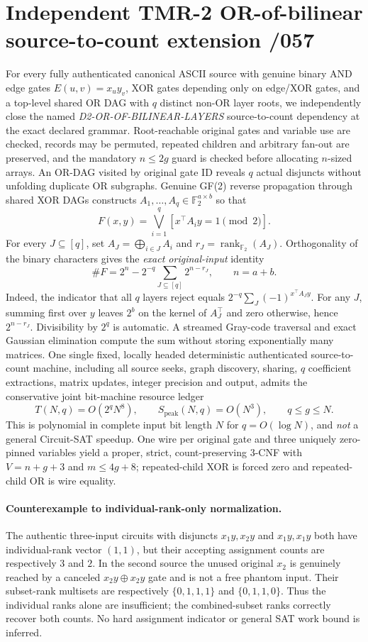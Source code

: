 \documentclass[11pt]{article}
\begin{document}
\section{Independent TMR-2 OR-of-bilinear source-to-count extension /057}
For every fully authenticated canonical ASCII source with genuine binary
AND edge gates \(E(u,v)=x_uy_v\), XOR gates depending only on edge/XOR
gates, and a top-level shared OR DAG with \(q\) distinct non-OR layer
roots, we independently close the named
\emph{D2-OR-OF-BILINEAR-LAYERS} source-to-count dependency at
the exact declared grammar. Root-reachable original gates and
variable use are checked, records may be permuted, repeated children
and arbitrary fan-out are preserved, and the mandatory \(n\le 2g\)
guard is checked before allocating \(n\)-sized arrays.
An OR-DAG visited by original gate ID reveals \(q\) actual disjuncts
without unfolding duplicate OR subgraphs. Genuine GF(2) reverse
propagation through shared XOR DAGs constructs
\(A_1,\ldots,A_q\in\mathbb F_2^{a\times b}\) so that
\[
F(x,y)=\bigvee_{i=1}^q[x^\top A_i y=1\pmod2].
\]
For every \(J\subseteq[q]\), set \(A_J=\bigoplus_{i\in J}A_i\)
and \(r_J=\operatorname{rank}_{\mathbb F_2}(A_J)\). Orthogonality of
the binary characters gives the \emph{exact original-input} identity
\[
\boxed{\quad
\#F=2^{n}-2^{-q}\sum_{J\subseteq[q]}2^{n-r_J},
\qquad n=a+b.
\quad}
\]
Indeed, the indicator that all \(q\) layers reject equals
\(2^{-q}\sum_J(-1)^{x^\top A_Jy}\).
For any \(J\), summing first over \(y\) leaves
\(2^{b}\) on the kernel of \(A_J^\top\) and zero otherwise, hence
\(2^{n-r_J}\). Divisibility by \(2^q\) is automatic.
A streamed Gray-code traversal and exact Gaussian elimination
compute the sum without storing exponentially many matrices.
One single fixed, locally headed deterministic authenticated
source-to-count machine, including all source seeks, graph discovery,
sharing, \(q\) coefficient extractions, matrix updates, integer
precision and output, admits the conservative joint bit-machine
resource ledger
\[
\boxed{\quad
T(N,q)=O(2^qN^8),\qquad
S_{\mathrm{peak}}(N,q)=O(N^3),\qquad q\le g\le N.
\quad}
\]
This is polynomial in complete input bit length \(N\) for
\(q=O(\log N)\), and \emph{not} a general Circuit-SAT speedup.
One wire per original gate and three uniquely zero-pinned
variables yield a proper, strict, count-preserving \(3\)-CNF
with \(V=n+g+3\) and \(m\le4g+8\); repeated-child XOR is forced
zero and repeated-child OR is wire equality.

\paragraph{Counterexample to individual-rank-only normalization.}
The authentic three-input circuits with disjuncts
\(x_1y,x_2y\) and \(x_1y,x_1y\) both have individual-rank
vector \((1,1)\), but their accepting assignment counts are
respectively \(3\) and \(2\). In the second source the unused
original \(x_2\) is genuinely reached by a canceled
\(x_2y\oplus x_2y\) gate and is not a free phantom input.
Their subset-rank multisets are respectively \(\{0,1,1,1\}\)
and \(\{0,1,1,0\}\). Thus the individual ranks alone
are insufficient; the combined-subset ranks correctly recover
both counts. No hard assignment indicator or general SAT work
bound is inferred.
\end{document}
